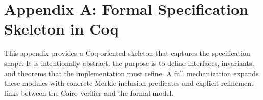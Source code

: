 \documentclass[conference]{IEEEtran}
\theoremstyle{definition}
\theoremstyle{plain}
\theoremstyle{remark}
\begin{document}
\appendices
\onecolumn

\section{Appendix A: Formal Specification Skeleton in Coq}
\label{app:coq}
This appendix provides a Coq-oriented skeleton that captures the specification shape. It is intentionally abstract: the purpose is to define interfaces, invariants, and theorems that the implementation must refine. A full mechanization expands these modules with concrete Merkle inclusion predicates and explicit refinement links between the Cairo verifier and the formal model.
\end{document}
